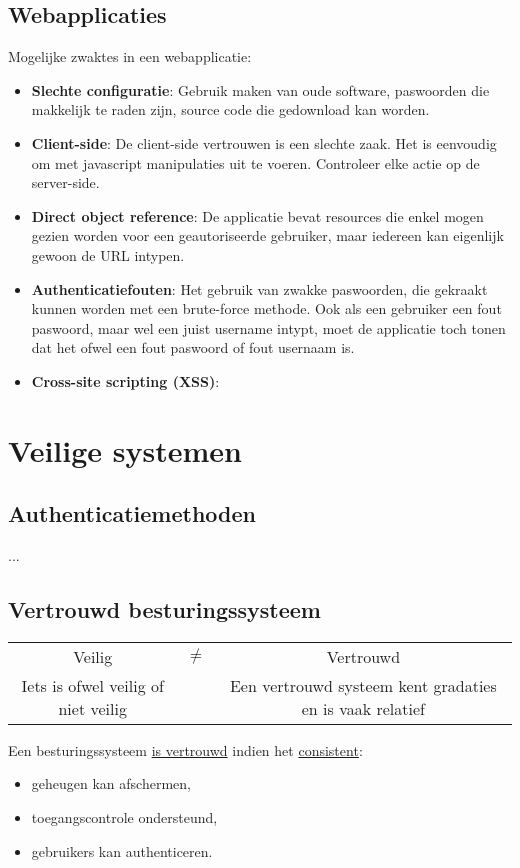 \documentclass{report}
\begin{document}
	\subsection{Webapplicaties}
	Mogelijke zwaktes in een webapplicatie:
	\begin{itemize}
		\item[\info] \textbf{Slechte configuratie}: Gebruik maken van oude software, paswoorden die makkelijk te raden zijn, source code die gedownload kan worden.
		\item[\info] \textbf{Client-side}: De client-side vertrouwen is een slechte zaak. Het is eenvoudig om met javascript manipulaties uit te voeren. Controleer elke actie op de server-side.
		\item[\info] \textbf{Direct object reference}: De applicatie bevat resources die enkel mogen gezien worden voor een geautoriseerde gebruiker, maar iedereen kan eigenlijk gewoon de URL intypen.
		\item[\info] \textbf{Authenticatiefouten}: Het gebruik van zwakke paswoorden, die gekraakt kunnen worden met een brute-force methode. Ook als een gebruiker een fout paswoord, maar wel een juist username intypt, moet de applicatie toch tonen dat het ofwel een fout paswoord of fout usernaam is.
		\item[\info] \textbf{Cross-site scripting (XSS)}: 
	\end{itemize}
	\section{Veilige systemen}
	\subsection{Authenticatiemethoden}
	...
	\subsection{Vertrouwd besturingssysteem}

	\begin{table}[ht]
		\centering
		\begin{tabular}{c c c}
			Veilig & $\neq$  & Vertrouwd \\

			Iets is ofwel veilig of niet veilig & & Een vertrouwd systeem kent gradaties en is vaak relatief
		\end{tabular}
	\end{table}

	Een besturingssysteem \underline{is vertrouwd} indien het \underline{consistent}:
	\begin{itemize}
		\item geheugen kan afschermen,
		\item toegangscontrole ondersteund,
		\item gebruikers kan authenticeren.
	\end{itemize}
\end{document}
